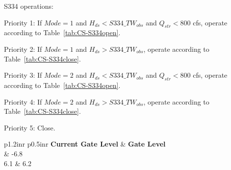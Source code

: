 S334 operations:
\begin{packed_items}
\item Priority 1: If $Mode=1$ and $H_{ds}<S334\_TW_{obs}$ and $Q_{str}<800$ cfs,  operate according to Table~\ref{tab:CS-S334open}.
\item Priority 2: If $Mode=1$ and $H_{ds}>S334\_TW_{obs}$,  operate according to Table~\ref{tab:CS-S334close}.
\item[]
\item Priority 3: If $Mode=2$ and $H_{ds}<S334\_TW_{obs}$ and $Q_{str}<800$ cfs, operate according to Table~\ref{tab:CS-S334open}.
\item Priority 4: If $Mode=2$ and $H_{ds}>S334\_TW_{obs}$,  operate according to Table~\ref{tab:CS-S334close}.
\item[]
\item Priority 5: Close.
\end{packed_items}

%


\footnotesize
\begin{table}[!h]
\centering
\caption{Control strategy for S334 open (units are ft. NGVD29)}
\label{tab:CS-S334open}
\begin{tabular}{p{1.2in}{r} p{0.5in}{r}}
\hline
\textbf{Current Gate Level} & \textbf{Gate Level}\\
	& -6.8       \\
6.1	& 6.2   \\
\hline
\end{tabular}
\end{table}
\normalsize

